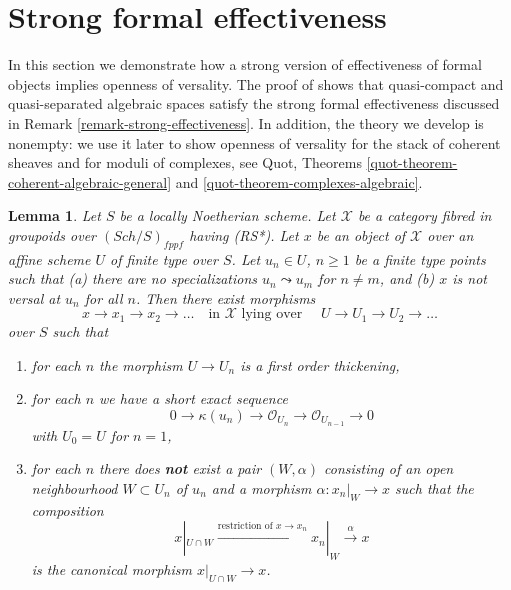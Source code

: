 \documentclass{stacks-project}
\theoremstyle{plain}
\newtheorem{lemma}[subsection]{Lemma}
\theoremstyle{definition}
\theoremstyle{remark}
\numberwithin{equation}{subsection}
\def\Sch{\mathit{Sch}}
\begin{document}
\section{Strong formal effectiveness}
\label{section-strong-formal-effectiveness}

\noindent
In this section we demonstrate how a strong version of effectiveness
of formal objects implies openness of versality. The proof of
\cite[Theorem 1.1]{Bhatt-Algebraize} shows that quasi-compact and
quasi-separated algebraic spaces satisfy the strong formal effectiveness
discussed in Remark \ref{remark-strong-effectiveness}. In addition, the
theory we develop is nonempty: we use it later to show openness of versality
for the stack of coherent sheaves and for moduli of complexes, see
Quot, Theorems
\ref{quot-theorem-coherent-algebraic-general} and
\ref{quot-theorem-complexes-algebraic}.

\begin{lemma}
\label{lemma-infinite-sequence-pre}
Let $S$ be a locally Noetherian scheme. Let $\mathcal{X}$ be a category
fibred in groupoids over $(\Sch/S)_{fppf}$ having (RS*).
Let $x$ be an object of
$\mathcal{X}$ over an affine scheme $U$ of finite type over $S$.
Let $u_n \in U$, $n \geq 1$ be a finite type points such that
(a) there are no specializations $u_n \leadsto u_m$ for $n \not = m$, and
(b) $x$ is not versal at $u_n$ for all $n$. Then there exist morphisms
$$
x \to x_1 \to x_2 \to \ldots
\quad\text{in }\mathcal{X}\text{ lying over }\quad
U \to U_1 \to U_2 \to \ldots
$$
over $S$ such that
\begin{enumerate}
\item for each $n$ the morphism $U \to U_n$ is a first order
thickening,
\item for each $n$ we have a short exact sequence
$$
0 \to \kappa(u_n) \to \mathcal{O}_{U_n} \to \mathcal{O}_{U_{n - 1}} \to 0
$$
with $U_0 = U$ for $n = 1$,
\item for each $n$ there does {\bf not} exist a pair $(W, \alpha)$
consisting of an open neighbourhood $W \subset U_n$ of $u_n$
and a morphism $\alpha : x_n|_W \to x$
such that the composition
$$
x|_{U \cap W} \xrightarrow{\text{restriction of }x \to x_n}
x_n|_W \xrightarrow{\alpha} x
$$
is the canonical morphism $x|_{U \cap W} \to x$.
\end{enumerate}
\end{lemma}
\end{document}
